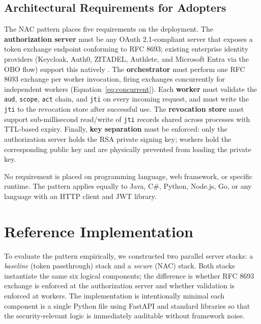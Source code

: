 \documentclass[journal]{IEEEtran}
\begin{document}
\subsection{Architectural Requirements for Adopters}

The NAC pattern places five requirements on the deployment. The
\textbf{authorization server} must be any OAuth 2.1-compliant server that
exposes a token exchange endpoint conforming to RFC 8693; existing enterprise
identity providers (Keycloak, Auth0, ZITADEL, Authlete, and Microsoft Entra via
the OBO flow) support this natively \cite{rfc8693_deploy}. The
\textbf{orchestrator} must perform one RFC 8693 exchange per worker invocation,
firing exchanges concurrently for independent workers
(Equation~\ref{eq:concurrent}). Each \textbf{worker} must validate the
\texttt{aud}, \texttt{scope}, \texttt{act} chain, and \texttt{jti} on every
incoming request, and must write the \texttt{jti} to the revocation store after
successful use. The \textbf{revocation store} must support sub-millisecond
read/write of \texttt{jti} records shared across processes with TTL-based
expiry. Finally, \textbf{key separation} must be enforced: only the
authorization server holds the RSA private signing key; workers hold the
corresponding public key and are physically prevented from loading the private
key.

No requirement is placed on programming language, web framework, or specific
runtime. The pattern applies equally to Java, C\#, Python, Node.js, Go, or any
language with an HTTP client and JWT library.


\section{Reference Implementation}
\label{sec:impl}

To evaluate the pattern empirically, we constructed two parallel server stacks:
a \textit{baseline} (token passthrough) stack and a \textit{secure} (NAC) stack.
Both stacks instantiate the same six logical components; the difference is whether
RFC 8693 exchange is enforced at the authorization server and whether validation
is enforced at workers. The implementation is intentionally minimal each
component is a single Python file using FastAPI and standard libraries so that
the security-relevant logic is immediately auditable without framework noise.
\end{document}
